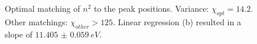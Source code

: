 \documentclass[a4paper]{scrartcl}
\numberwithin{equation}{section}
\numberwithin{figure}{section}
\numberwithin{table}{section}
\begin{document}
\begin{figure} 
 \centering
{}
\hfill
{}
\caption{\small Optimal matching of $n^2$ to the peak positions. Variance: $\chi_{opt}= 14.2$. Other matchings: $\chi_{other} > 125$. Linear regression (b) resulted in a slope of $\SI{11.405(59)}{eV}$. }
	\label{fig:IV2}
\end{figure}
\end{document}
